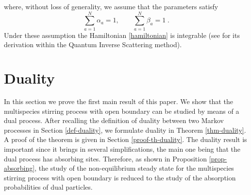 \documentclass[10pt]{article}
\numberwithin{equation}{section}
\numberwithin{equation}{subsection}
\begin{document}
where, without loss of generality,  we assume that the parameters satisfy
\begin{equation}\label{ratesConditions}
	\sum_{a=1}^{N}\alpha_{a}=1,\qquad\sum_{a=1}^{N}\beta_{a}=1\;.
\end{equation} 
Under these assumption the Hamiltonian \ref{hamiltonian} is integrable (see \cite{vanicat2017exact} for its derivation within the Quantum Inverse Scattering method). 


\section{Duality}\label{sectionDuality}
In this section we prove the first main result of this paper. We show that the multispecies stirring process with open boundary
can be studied by means of a dual process. After recalling the definition of duality between two
Markov processes in Section \ref{def-duality}, we formulate duality  in Theorem \ref{thm-duality}. A proof of the theorem is given in Section \ref{proof-th-duality}.
The duality result is important since it brings in several simplifications, the main one being that the
dual process has absorbing sites. Therefore, as shown in Proposition \ref{prop-absorbing}, the study of the non-equilibrium steady state for  the multispecies stirring process with open boundary
is reduced to the study of the absorption probabilities of dual particles.
\end{document}

